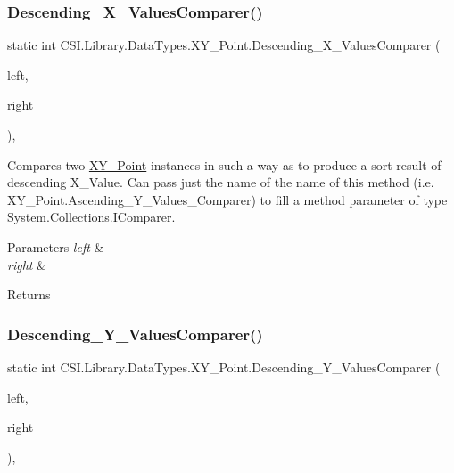 \subsubsection{\texorpdfstring{Descending\_X\_ValuesComparer()}{Descending\_X\_ValuesComparer()}}
{\footnotesize\ttfamily static int C\+S\+I.\+Library.\+Data\+Types.\+X\+Y\+\_\+\+Point.\+Descending\+\_\+\+X\+\_\+\+Values\+Comparer (\begin{DoxyParamCaption}\item[{\mbox{\hyperlink{struct_c_s_i_1_1_library_1_1_data_types_1_1_x_y___point}{X\+Y\+\_\+\+Point}}}]{left,  }\item[{\mbox{\hyperlink{struct_c_s_i_1_1_library_1_1_data_types_1_1_x_y___point}{X\+Y\+\_\+\+Point}}}]{right }\end{DoxyParamCaption})\hspace{0.3cm}{\ttfamily [inline]}, {\ttfamily [static]}}



Compares two \mbox{\hyperlink{struct_c_s_i_1_1_library_1_1_data_types_1_1_x_y___point}{X\+Y\+\_\+\+Point}} instances in such a way as to produce a sort result of descending X\+\_\+\+Value. Can pass just the name of the name of this method (i.\+e. X\+Y\+\_\+\+Point.\+Ascending\+\_\+\+Y\+\_\+\+Values\+\_\+\+Comparer) to fill a method parameter of type System.\+Collections.\+I\+Comparer. 


\begin{DoxyParams}{Parameters}
{\em left} & \\
\hline
{\em right} & \\
\hline
\end{DoxyParams}
\begin{DoxyReturn}{Returns}

\end{DoxyReturn}
\mbox{\label{struct_c_s_i_1_1_library_1_1_data_types_1_1_x_y___point_af8c1207e1a624367f6cf1c7ad0b28786}} 
\subsubsection{\texorpdfstring{Descending\_Y\_ValuesComparer()}{Descending\_Y\_ValuesComparer()}}
{\footnotesize\ttfamily static int C\+S\+I.\+Library.\+Data\+Types.\+X\+Y\+\_\+\+Point.\+Descending\+\_\+\+Y\+\_\+\+Values\+Comparer (\begin{DoxyParamCaption}\item[{\mbox{\hyperlink{struct_c_s_i_1_1_library_1_1_data_types_1_1_x_y___point}{X\+Y\+\_\+\+Point}}}]{left,  }\item[{\mbox{\hyperlink{struct_c_s_i_1_1_library_1_1_data_types_1_1_x_y___point}{X\+Y\+\_\+\+Point}}}]{right }\end{DoxyParamCaption})\hspace{0.3cm}{\ttfamily [inline]}, {\ttfamily [static]}}



